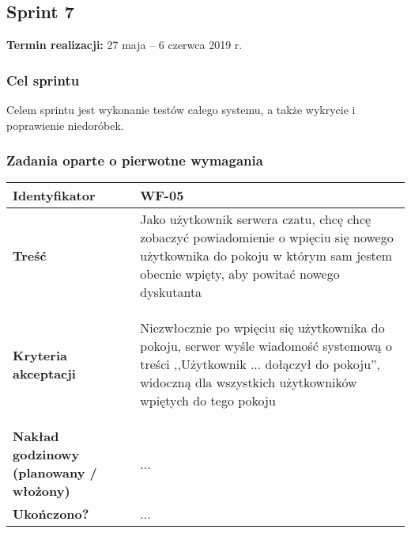 \subsection{Sprint 7}

\textbf{Termin realizacji:} 27 maja -- 6 czerwca 2019 r.

\subsubsection{Cel sprintu}
Celem sprintu jest wykonanie testów całego systemu, a także wykrycie i
poprawienie niedoróbek.

\subsubsection{Zadania oparte o pierwotne wymagania}

\leavevmode\hbox{}

\begin{tabular}{ | l | l | }
	\hline
		\textbf{Identyfikator} &
		WF-05
		\\

	\hline
		\textbf{Treść} & \parbox[t]{11.5cm}{\strut
			Jako użytkownik serwera czatu, chcę chcę zobaczyć
			powiadomienie o wpięciu się nowego użytkownika do
			pokoju w którym sam jestem obecnie wpięty, aby powitać
			nowego dyskutanta
		\strut}\\

	\hline
		\parbox[t]{4cm}{\textbf{Kryteria akceptacji}} & \parbox[t]{11.5cm}{\strut
			\begin{enumreq}
				\item Niezwłocznie po wpięciu się użytkownika do
				pokoju, serwer wyśle wiadomość systemową o treści
				,,Użytkownik ... dołączył do pokoju'', widoczną
				dla wszystkich użytkowników wpiętych do tego pokoju
			\end{enumreq}
			\strut}
		\\

	\hline

  \parbox[t]{4cm}{\textbf{Nakład godzinowy (planowany / włożony)}} &
  \parbox[t]{11.5cm}{\strut
    ...
  \strut}\\

  \hline
    \parbox[t]{4cm}{\textbf{Ukończono?}} &
    \parbox[t]{11.5cm}{\strut
      ...
    \strut}\\
\hline
\end{tabular}

\vspace{1em}


